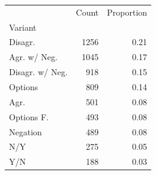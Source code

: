\begin{tabular}{lrr}
\toprule
 & Count & Proportion \\
Variant &  &  \\
\midrule
Disagr. & 1256 & 0.21 \\
Agr. w/ Neg. & 1045 & 0.17 \\
Disagr. w/ Neg. & 918 & 0.15 \\
Options & 809 & 0.14 \\
Agr. & 501 & 0.08 \\
Options F. & 493 & 0.08 \\
Negation & 489 & 0.08 \\
N/Y & 275 & 0.05 \\
Y/N & 188 & 0.03 \\
\bottomrule
\end{tabular}
